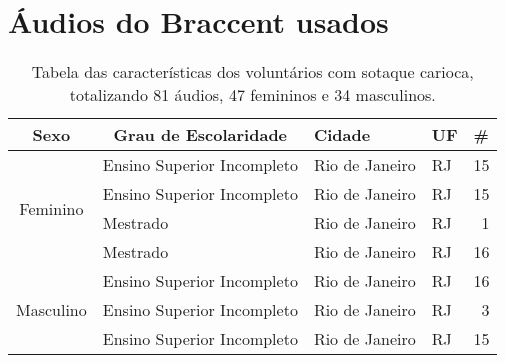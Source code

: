
\chapter{Áudios do Braccent usados}



\begin{table}[h]
\caption{Tabela das características dos voluntários com sotaque carioca, totalizando 81 áudios, 47 femininos e 34 masculinos.} \label{Tabela_carioca}
\begin{tabular}{|c|l|l|l|r|}
\hline
Sexo                                             & \multicolumn{1}{c|}{Grau de Escolaridade} & Cidade         & UF & \multicolumn{1}{l|}{\#} \\ \hline
\multirow{4}{*}{Feminino}                        & Ensino Superior Incompleto                & Rio de Janeiro & RJ & 15                      \\ \cline{2-5} 
                                                 & Ensino Superior Incompleto                & Rio de Janeiro & RJ & 15                      \\ \cline{2-5} 
                                                 & Mestrado                                  & Rio de Janeiro & RJ & 1                       \\ \cline{2-5} 
                                                 & Mestrado                                  & Rio de Janeiro & RJ & 16                      \\ \hline
\multicolumn{1}{|l|}{\multirow{3}{*}{Masculino}} & Ensino Superior Incompleto                & Rio de Janeiro & RJ & 16                      \\ \cline{2-5} 
\multicolumn{1}{|l|}{}                           & Ensino Superior Incompleto                & Rio de Janeiro & RJ & 3                       \\ \cline{2-5} 
\multicolumn{1}{|l|}{}                           & Ensino Superior Incompleto                & Rio de Janeiro & RJ & 15                      \\ \hline
\end{tabular}

\end{table}

